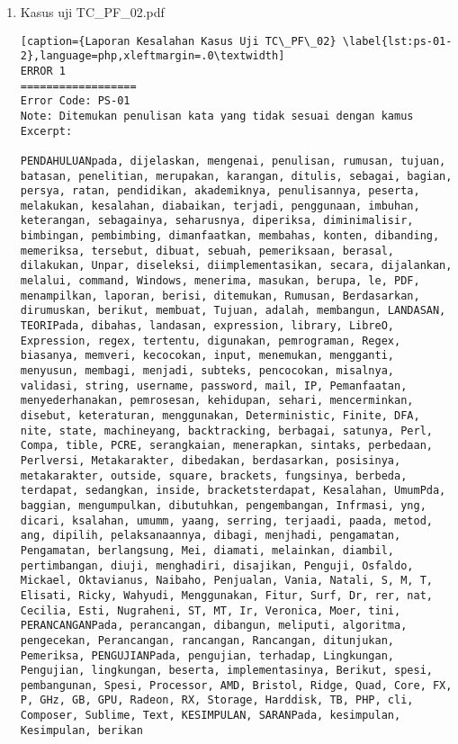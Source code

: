 \begin{enumerate}
	\item Kasus uji TC\_PF\_02.pdf

\begin{lstlisting}[caption={Laporan Kesalahan Kasus Uji TC\_PF\_02}	\label{lst:ps-01-2},language=php,xleftmargin=.0\textwidth]
ERROR 1
==================
Error Code: PS-01
Note: Ditemukan penulisan kata yang tidak sesuai dengan kamus
Excerpt: 

PENDAHULUANpada, dijelaskan, mengenai, penulisan, rumusan, tujuan, batasan, penelitian, merupakan, karangan, ditulis, sebagai, bagian, persya, ratan, pendidikan, akademiknya, penulisannya, peserta, melakukan, kesalahan, diabaikan, terjadi, penggunaan, imbuhan, keterangan, sebagainya, seharusnya, diperiksa, diminimalisir, bimbingan, pembimbing, dimanfaatkan, membahas, konten, dibanding, memeriksa, tersebut, dibuat, sebuah, pemeriksaan, berasal, dilakukan, Unpar, diseleksi, diimplementasikan, secara, dijalankan, melalui, command, Windows, menerima, masukan, berupa, le, PDF, menampilkan, laporan, berisi, ditemukan, Rumusan, Berdasarkan, dirumuskan, berikut, membuat, Tujuan, adalah, membangun, LANDASAN, TEORIPada, dibahas, landasan, expression, library, LibreO, Expression, regex, tertentu, digunakan, pemrograman, Regex, biasanya, memveri, kecocokan, input, menemukan, mengganti, menyusun, membagi, menjadi, subteks, pencocokan, misalnya, validasi, string, username, password, mail, IP, Pemanfaatan, menyederhanakan, pemrosesan, kehidupan, sehari, mencerminkan, disebut, keteraturan, menggunakan, Deterministic, Finite, DFA, nite, state, machineyang, backtracking, berbagai, satunya, Perl, Compa, tible, PCRE, serangkaian, menerapkan, sintaks, perbedaan, Perlversi, Metakarakter, dibedakan, berdasarkan, posisinya, metakarakter, outside, square, brackets, fungsinya, berbeda, terdapat, sedangkan, inside, bracketsterdapat, Kesalahan, UmumPda, baggian, mengumpulkan, dibutuhkan, pengembangan, Infrmasi, yng, dicari, ksalahan, umumm, yaang, serring, terjaadi, paada, metod, ang, dipilih, pelaksanaannya, dibagi, menjhadi, pengamatan, Pengamatan, berlangsung, Mei, diamati, melainkan, diambil, pertimbangan, diuji, menghadiri, disajikan, Penguji, Osfaldo, Mickael, Oktavianus, Naibaho, Penjualan, Vania, Natali, S, M, T, Elisati, Ricky, Wahyudi, Menggunakan, Fitur, Surf, Dr, rer, nat, Cecilia, Esti, Nugraheni, ST, MT, Ir, Veronica, Moer, tini, PERANCANGANPada, perancangan, dibangun, meliputi, algoritma, pengecekan, Perancangan, rancangan, Rancangan, ditunjukan, Pemeriksa, PENGUJIANPada, pengujian, terhadap, Lingkungan, Pengujian, lingkungan, beserta, implementasinya, Berikut, spesi, pembangunan, Spesi, Processor, AMD, Bristol, Ridge, Quad, Core, FX, P, GHz, GB, GPU, Radeon, RX, Storage, Harddisk, TB, PHP, cli, Composer, Sublime, Text, KESIMPULAN, SARANPada, kesimpulan, Kesimpulan, berikan
\end{lstlisting}
\end{enumerate}

